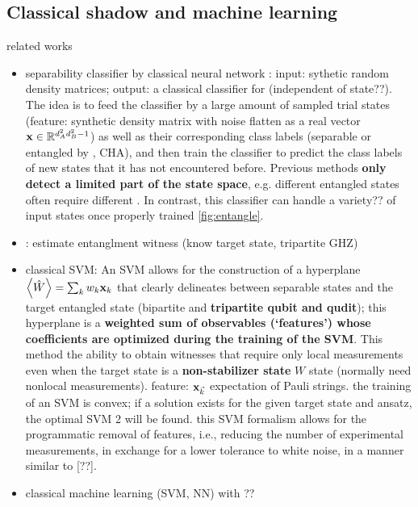 \documentclass[
10pt,
aps,
pra,
linenumbers,
floatfix,
]{revtex4-2}
\theoremstyle{plain}
\theoremstyle{definition}
\newcommand{\ew}{\hat{W}}
\begin{document}
\subsection{Classical shadow and machine learning}
related works
\begin{itemize}
	\item separability classifier by classical neural network \cite{luSeparabilityEntanglementClassifierMachine2018}:
	input: sythetic random density matrices;
	output: a classical classifier for  (independent of state??).
	The idea is to feed the classifier by a large amount of sampled trial states (feature: synthetic density matrix with noise flatten as a real vector $\vb{x}\in\mathbb{R}^{d_A^2d_B^2-1}$) as well as their corresponding class labels (separable or entangled by , CHA), and then train the classifier to predict the class labels of new states that it has not encountered before.
	Previous methods \textbf{only detect a limited part of the state space}, e.g. different entangled states often require different . In contrast, this classifier can handle a variety?? of input states once properly trained \cref{fig:entangle}.

	\item {} \cite{huangPredictingManyProperties2020}: estimate entanglment witness (know target state, tripartite GHZ)

	\item classical SVM: An SVM allows for the construction of a hyperplane $\expval{\ew}=\sum_k w_k \vbx_{k}$ that clearly delineates between separable states and the target entangled state (bipartite and \textbf{tripartite qubit and qudit}); this hyperplane is a \textbf{weighted sum of observables (`features') whose coefficients are optimized during the training of the SVM}.
	This method the ability to obtain witnesses that require only local measurements even when the target state is a \textbf{non-stabilizer state} $W$ state (normally need nonlocal measurements).
	feature: $\vb{x}_{\vec{k}}$ expectation of Pauli strings.
	the training of an SVM is convex; if a solution exists for the given target state and ansatz, the optimal SVM 2 will be found.
	this SVM formalism allows for the programmatic removal of features, i.e., reducing the number of experimental measurements, in exchange for a lower tolerance to white noise, in a manner similar to [??].

	\item classical machine learning (SVM, NN) with  \cite{huangProvablyEfficientMachine2021}??

\end{itemize}
\end{document}
